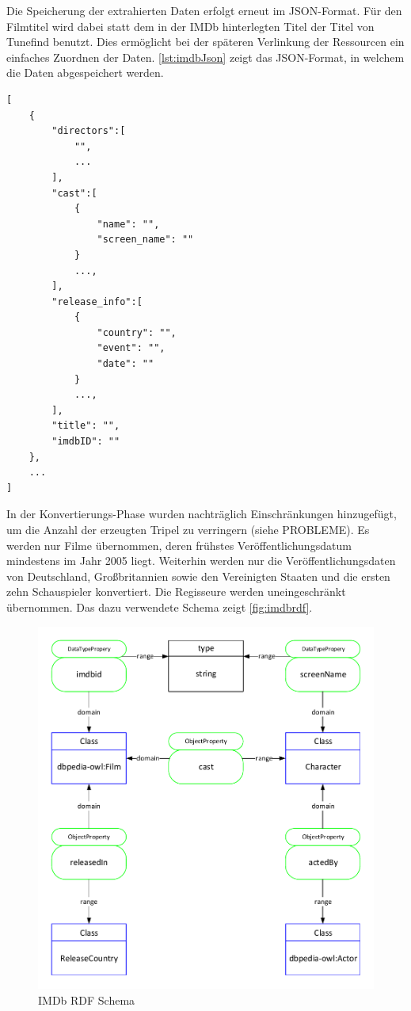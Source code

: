 \documentclass[parskip]{scrartcl}
\begin{document}
Die Speicherung der extrahierten Daten erfolgt erneut im JSON-Format. Für den Filmtitel wird dabei statt dem in der IMDb hinterlegten Titel der Titel von Tunefind benutzt. Dies ermöglicht bei der späteren Verlinkung der Ressourcen ein einfaches Zuordnen der Daten. \autoref{lst:imdbJson} zeigt das JSON-Format, in welchem die Daten abgespeichert werden.

\begin{lstlisting}[caption={IMDb JSON-Format}, label={lst:imdbJson}]
[  
    {  
        "directors":[  
            "",
            ...
        ],
        "cast":[
            {
                "name": "",
                "screen_name": ""
            }
            ...,
        ],
        "release_info":[
            {
                "country": "",
                "event": "",
                "date": ""
            }
            ...,
        ],
        "title": "",
        "imdbID": ""
    },
    ...
]
\end{lstlisting}

In der Konvertierungs-Phase wurden nachträglich Einschränkungen hinzugefügt, um die Anzahl der erzeugten Tripel zu verringern (siehe PROBLEME). Es werden nur Filme übernommen, deren frühstes Veröffentlichungsdatum mindestens im Jahr 2005 liegt. Weiterhin werden nur die Veröffentlichungsdaten von Deutschland, Großbritannien sowie den Vereinigten Staaten und die ersten zehn Schauspieler konvertiert. Die Regisseure werden uneingeschränkt übernommen. Das dazu verwendete Schema zeigt \autoref{fig:imdbrdf}.

\begin{figure}[H]
    \centering
    \caption{IMDb RDF Schema}
    \label{fig:imdbrdf}
    \includegraphics[scale=0.8]{imdb}
\end{figure}
\end{document}
